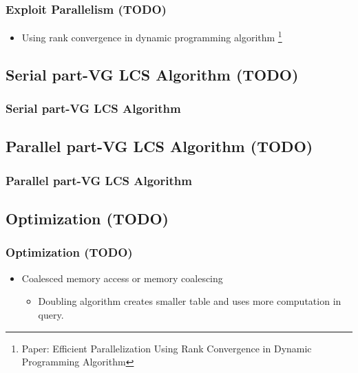 \begin{frame}
	\frametitle{Exploit Parallelism (TODO)}
	\begin{itemize}
		\item Using rank convergence in dynamic programming algorithm
			\footnote{Paper: Efficient Parallelization Using Rank Convergence in 
				Dynamic Programming Algorithm}
	\end{itemize}
\end{frame}

\subsection{Serial part-VG LCS Algorithm (TODO)}
\begin{frame}
	\frametitle{Serial part-VG LCS Algorithm}
\end{frame}

\subsection{Parallel part-VG LCS Algorithm (TODO)}
\begin{frame}
	\frametitle{Parallel part-VG LCS Algorithm}
\end{frame}

\subsection{Optimization (TODO)}
\begin{frame}
	\frametitle{Optimization (TODO)}
	\begin{itemize}
		\item Coalesced memory access or memory coalescing
			\begin{itemize}
				\item Doubling algorithm creates smaller table
					and uses more computation in query.
			\end{itemize}
	\end{itemize}
\end{frame}